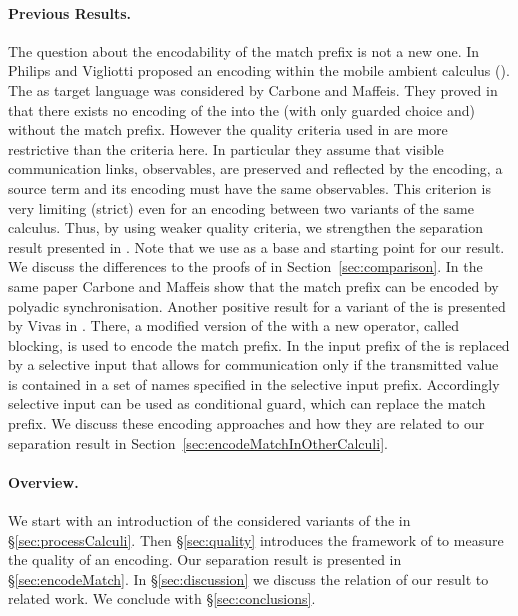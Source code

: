 \documentclass[]{article}
\begin{document}
\paragraph{Previous Results.} The question about the encodability of the match prefix is not a new one. In \cite{vig} Philips and Vigliotti proposed an encoding within the mobile ambient calculus (\cite{cardelliGordon00}). The \piCal as target language was considered by Carbone and Maffeis. They proved in \cite{carbone} that there exists no encoding of the \piCal into the \piCal (with only guarded choice and) without the match prefix. However the quality criteria used in \cite{carbone} are more restrictive than the criteria here. In particular they assume that visible communication links, \ie observables, are preserved and reflected by the encoding, \ie a source term and its encoding must have the same observables. This criterion is very limiting (\ie strict) even for an encoding between two variants of the same calculus. Thus, by using weaker quality criteria, we strengthen the separation result presented in \cite{carbone}. Note that we use \cite{carbone} as a base and starting point for our result. We discuss the differences to the proofs of \cite{carbone} in Section~\ref{sec:comparison}.
In the same paper Carbone and Maffeis show that the match prefix can be encoded by polyadic synchronisation.
Another positive result for a variant of the \piCal is presented by Vivas in \cite{vivas}. There, a modified version of the \piCal with a new operator, called blocking, is used to encode the match prefix.
In \cite{bodeiDeganoPriami05} the input prefix of the \piCal is replaced by a selective input that allows for communication only if the transmitted value is contained in a set of names specified in the selective input prefix. Accordingly selective input can be used as conditional guard, which can replace the match prefix. We discuss these encoding approaches and how they are related to our separation result in Section~\ref{sec:encodeMatchInOtherCalculi}.

\paragraph{Overview.} We start with an introduction of the considered variants of the \piCal in \S\ref{sec:processCalculi}. Then \S\ref{sec:quality} introduces the framework of \cite{gorla} to measure the quality of an encoding. Our separation result is presented in \S\ref{sec:encodeMatch}. In \S\ref{sec:discussion} we discuss the relation of our result to related work. We conclude with \S\ref{sec:conclusions}.
\end{document}
